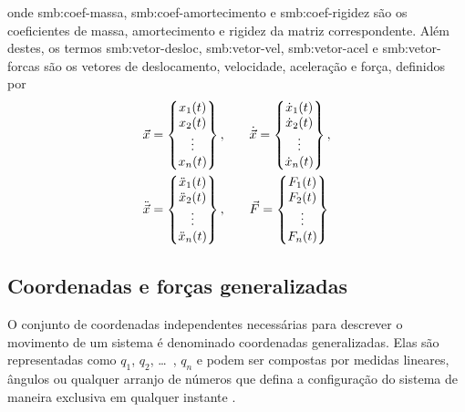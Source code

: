 \documentclass[12pt,openright,oneside,a4paper,
	chapter=TITLE,section=TITLE,
	english,brazil]{abntex2}
\begin{document}
	onde \gls{smb:coef-massa}, \gls{smb:coef-amortecimento} e \gls{smb:coef-rigidez} são os coeficientes de massa, amortecimento e rigidez da matriz correspondente.	Além destes, os termos \gls{smb:vetor-desloc}, \gls{smb:vetor-vel}, \gls{smb:vetor-acel} e \gls{smb:vetor-forcas} são os vetores de deslocamento, velocidade, aceleração e força, definidos por
	\begin{align} \label{eqn:vetores}
		\vec{x} =
		\begin{Bmatrix}
			x_1(t)\\ x_2(t)\\ \vdots\\ x_n(t)\\
		\end{Bmatrix},\qquad &
		\dot{\vec{x}} = 
		\begin{Bmatrix}
			\dot{x}_1(t)\\ \dot{x}_2(t)\\ \vdots\\ \dot{x}_n(t)\\
		\end{Bmatrix}, \notag\\
		\ddot{\vec{x}} = 
		\begin{Bmatrix}
			\ddot{x}_1(t)\\ \ddot{x}_2(t)\\ \vdots \\ \ddot{x}_n(t)\\  
		\end{Bmatrix},\qquad &
		\vec{F} = 
		\begin{Bmatrix}
			F_1(t)\\ F_2(t)\\ \vdots\\ F_n(t)\\
		\end{Bmatrix}
	\end{align}
	
	\subsection{Coordenadas e forças generalizadas} \label{sec:coord-generalizadas}
	O conjunto de coordenadas independentes necessárias para descrever o movimento de um sistema é denominado coordenadas generalizadas. Elas são representadas como $q_1$, $q_2$, \dots\ , $q_n$ e podem ser compostas por medidas lineares, ângulos ou qualquer arranjo de números que defina a configuração do sistema de maneira exclusiva em qualquer instante \cite{rao:2008}.
	
\end{document}
